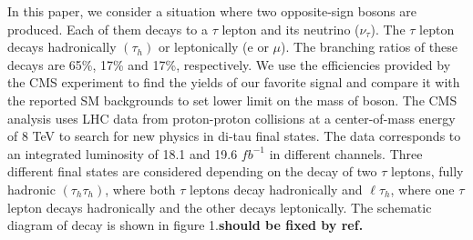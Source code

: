 In this paper, we consider a situation where two opposite-sign \wprime bosons are produced. Each of them decays to a $\tau$ lepton and its neutrino ($\nu_{\tau}$). The $\tau$ lepton decays hadronically $(\tau_h)$  or leptonically (e or $\mu$). The branching ratios of these decays are 65\%, 17\% and 17\%, respectively. We use the efficiencies provided by the CMS experiment \cite{CMS:2016saj} to find the yields of our favorite signal and compare it with the reported SM backgrounds to set lower limit on the mass of \wprime boson. 
The CMS analysis uses LHC data from proton-proton collisions at a center-of-mass energy of 8 TeV to search for new physics in di-tau final states.  The data corresponds to an integrated luminosity of 18.1 and 19.6 $fb^{-1}$ in different channels. Three different final states are considered depending on the decay of two $\tau$ leptons, fully hadronic $(\tau_h \tau_h)$, where both $\tau$ leptons decay hadronically and $\ell\tau_h$, where one $\tau$ lepton decays hadronically and the other decays leptonically. The schematic diagram of decay is shown in figure 1.{\bf should be fixed by ref.}